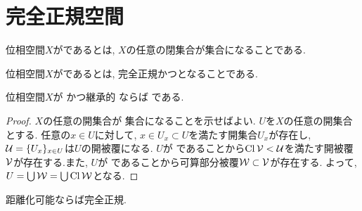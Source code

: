 \documentclass[uplatex, dvipdfmx, a4paper, 12pt, class=jsbook, crop=false]{standalone}
\begin{document}
\section{完全正規空間}
\label{sec:completely-normal-spaces}

\begin{definition}
	位相空間$ X $がであるとは, $ X $の任意の閉集合が\Gdelta 集合になることである.
\end{definition}

\begin{definition}
	位相空間$ X $がであるとは, 完全正規かつとなることである.
\end{definition}

\begin{proposition}
	\label{prop:T_3 + hLind. implies T_6}
	位相空間$X$が かつ継承的 \Lindelof ならば である.
\end{proposition}
\begin{proof}
	$X$の任意の開集合が \Fsigma 集合になることを示せばよい. $U$を$X$の任意の開集合とする. 任意の$x\in U$に対して, $x\in U_x\subset U$を満たす開集合$U_x$が存在し, 
	${\cal U}=\{U_x\}_{x\in U}$は$U$の開被覆になる. $U$が  であることから$\mathop{\mathrm{Cl}}\nolimits {\cal V}< {\cal U}$を満たす開被覆${\cal V}$が存在する.また, 
	$U$が \Lindelof であることから可算部分被覆${\cal W}\subset {\cal V}$が存在する.
	よって, $U=\bigcup {\cal W}=\bigcup \mathop{\mathrm{Cl}}\nolimits {\cal W}$となる.
\end{proof}

\begin{proposition}
	距離化可能ならば完全正規.
\end{proposition}
\end{document}
